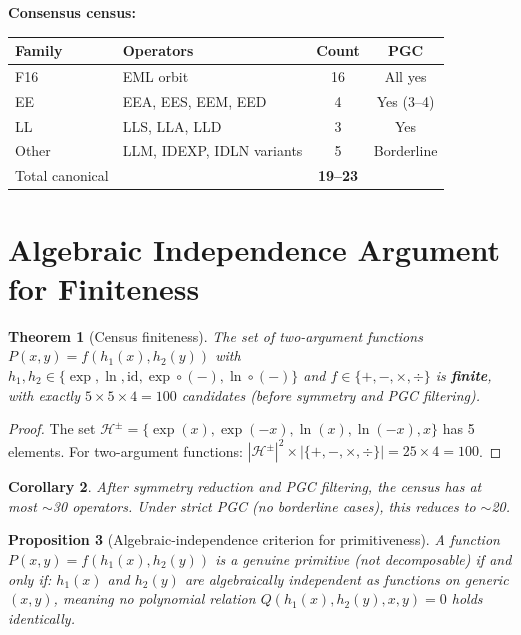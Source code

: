 \documentclass[11pt]{article}
\newtheorem{theorem}{Theorem}
\newtheorem{proposition}[theorem]{Proposition}
\newtheorem{corollary}[theorem]{Corollary}
\begin{document}
\textbf{Consensus census:}

\begin{center}
\begin{tabular}{llcc}
\toprule
Family & Operators & Count & PGC \\
\midrule
F16 & EML orbit & 16 & All yes \\
EE & EEA, EES, EEM, EED & 4 & Yes (3--4) \\
LL & LLS, LLA, LLD & 3 & Yes \\
Other & LLM, IDEXP, IDLN variants & 5 & Borderline \\
\midrule
Total canonical & & \textbf{19--23} & \\
\bottomrule
\end{tabular}
\end{center}

\section{Algebraic Independence Argument for Finiteness}
\label{sec:algebraic}

\begin{theorem}[Census finiteness]
\label{thm:finite}
The set of two-argument functions $P(x,y) = f(h_1(x), h_2(y))$
with $h_1, h_2 \in \{\exp, \ln, \mathrm{id}, \exp \circ (-), \ln \circ (-)\}$
and $f \in \{+,-,\times,\div\}$ is \textbf{finite}, with exactly $5 \times 5 \times 4 = 100$
candidates (before symmetry and PGC filtering).
\end{theorem}

\begin{proof}
The set $\mathcal{H}^{\pm} = \{\exp(x), \exp(-x), \ln(x), \ln(-x), x\}$
has 5 elements. For two-argument functions:
$|\mathcal{H}^\pm|^2 \times |\{+,-,\times,\div\}| = 25 \times 4 = 100$.
\end{proof}

\begin{corollary}
After symmetry reduction and PGC filtering, the census has at most $\sim$30
operators. Under strict PGC (no borderline cases), this reduces to $\sim$20.
\end{corollary}

\begin{proposition}[Algebraic-independence criterion for primitiveness]
A function $P(x,y) = f(h_1(x), h_2(y))$ is a genuine primitive (not decomposable)
if and only if: $h_1(x)$ and $h_2(y)$ are \emph{algebraically independent} as
functions on generic $(x,y)$, meaning no polynomial relation
$Q(h_1(x), h_2(y), x, y) = 0$ holds identically.
\end{proposition}
\end{document}
